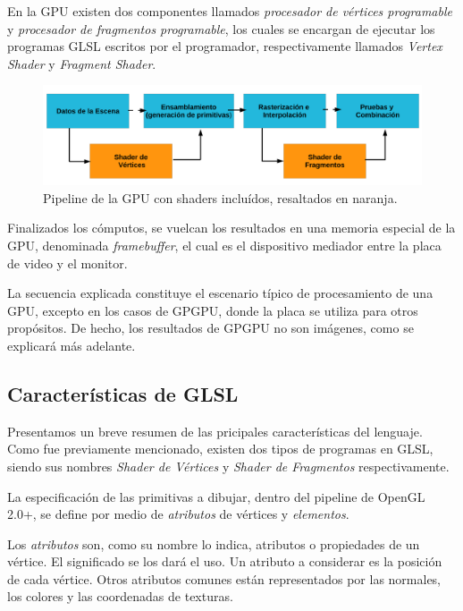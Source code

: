En la GPU existen dos componentes llamados {\em procesador de v\'ertices programable} y {\em procesador de fragmentos programable}, los cuales se encargan de ejecutar los programas GLSL escritos por el programador, respectivamente llamados {\em Vertex Shader} y {\em Fragment Shader}.

\begin{figure}[h]
\begin{center}
\includegraphics[width=13cm]{figures/pipelinegrafico}
\end{center}
\caption[Pipeline de la GPU con shaders incluídos]{Pipeline de la GPU con shaders incluídos, resaltados en naranja.}
\label{fg:pipelinegrafico}
\end{figure}

Finalizados los cómputos, se vuelcan los resultados en una memoria especial de la GPU, denominada {\em framebuffer}, el cual es el dispositivo mediador entre la placa de video y el monitor.

La secuencia explicada constituye el escenario típico de procesamiento de una GPU, excepto en los casos de GPGPU, donde la placa se utiliza para otros propósitos.
De hecho, los resultados de GPGPU no son imágenes, como se explicará más adelante.


\subsection{Características de GLSL}
Presentamos un breve resumen de las pricipales caracter\'isticas del lenguaje.
Como fue previamente mencionado, existen dos tipos de programas en GLSL, siendo sus nombres {\em Shader de Vértices} y {\em Shader de Fragmentos} respectivamente.

La especificación de las primitivas a dibujar, dentro del pipeline de OpenGL 2.0+, se define por medio de {\em atributos} de vértices y {\em elementos}. 


Los \emph{atributos} son, como su nombre lo indica, atributos o propiedades de un vértice. El significado se los dará el uso.
Un atributo a considerar es la posición de cada vértice.
Otros atributos comunes están representados por las normales, los colores y las coordenadas de texturas.

